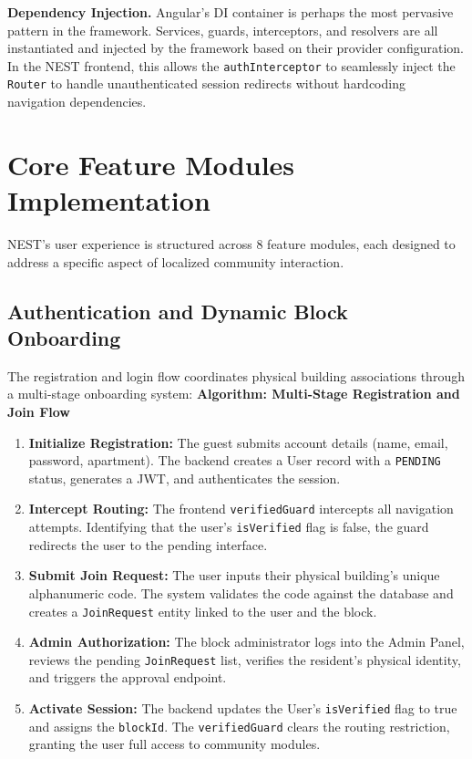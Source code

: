 \textbf{Dependency Injection.} Angular's DI container is perhaps the most pervasive pattern in the framework. Services, guards, interceptors, and resolvers are all instantiated and injected by the framework based on their provider configuration. In the NEST frontend, this allows the \texttt{authInterceptor} to seamlessly inject the \texttt{Router} to handle unauthenticated session redirects without hardcoding navigation dependencies.

\section{Core Feature Modules Implementation}
NEST's user experience is structured across 8 feature modules, each designed to address a specific aspect of localized community interaction.

\subsection{Authentication and Dynamic Block Onboarding}
The registration and login flow coordinates physical building associations through a multi-stage onboarding system:
\textbf{Algorithm: Multi-Stage Registration and Join Flow}
\begin{enumerate}[label=\textbf{Step \arabic*:}, leftmargin=*]
    \item \textbf{Initialize Registration:} The guest submits account details (name, email, password, apartment). The backend creates a User record with a \texttt{PENDING} status, generates a JWT, and authenticates the session.
    \item \textbf{Intercept Routing:} The frontend \texttt{verifiedGuard} intercepts all navigation attempts. Identifying that the user's \texttt{isVerified} flag is false, the guard redirects the user to the pending interface.
    \item \textbf{Submit Join Request:} The user inputs their physical building's unique alphanumeric code. The system validates the code against the database and creates a \texttt{JoinRequest} entity linked to the user and the block.
    \item \textbf{Admin Authorization:} The block administrator logs into the Admin Panel, reviews the pending \texttt{JoinRequest} list, verifies the resident's physical identity, and triggers the approval endpoint.
    \item \textbf{Activate Session:} The backend updates the User's \texttt{isVerified} flag to true and assigns the \texttt{blockId}. The \texttt{verifiedGuard} clears the routing restriction, granting the user full access to community modules.
\end{enumerate}

